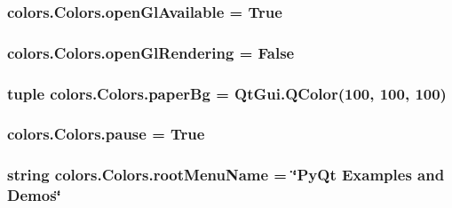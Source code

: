 \subsubsection[{open\+Gl\+Available}]{\setlength{\rightskip}{0pt plus 5cm}colors.\+Colors.\+open\+Gl\+Available = {\bf True}\hspace{0.3cm}{\ttfamily [static]}}\label{classcolors_1_1Colors_a4d91973ecabf3e7740dd09fbcc95982e}
\hypertarget{classcolors_1_1Colors_ab4faefdf4c3cb0a437cdd0eadb81b238}{}
\subsubsection[{open\+Gl\+Rendering}]{\setlength{\rightskip}{0pt plus 5cm}colors.\+Colors.\+open\+Gl\+Rendering = {\bf False}\hspace{0.3cm}{\ttfamily [static]}}\label{classcolors_1_1Colors_ab4faefdf4c3cb0a437cdd0eadb81b238}
\hypertarget{classcolors_1_1Colors_aef5420b74f0f68005bcf2a88d3f5200c}{}
\subsubsection[{paper\+Bg}]{\setlength{\rightskip}{0pt plus 5cm}tuple colors.\+Colors.\+paper\+Bg = Qt\+Gui.\+Q\+Color(100, 100, 100)\hspace{0.3cm}{\ttfamily [static]}}\label{classcolors_1_1Colors_aef5420b74f0f68005bcf2a88d3f5200c}
\hypertarget{classcolors_1_1Colors_a33b2117c663eabe2ca83e2a17ae660bd}{}
\subsubsection[{pause}]{\setlength{\rightskip}{0pt plus 5cm}colors.\+Colors.\+pause = {\bf True}\hspace{0.3cm}{\ttfamily [static]}}\label{classcolors_1_1Colors_a33b2117c663eabe2ca83e2a17ae660bd}
\hypertarget{classcolors_1_1Colors_a4fda4c85205913fd97fa583c1cdc66f6}{}
\subsubsection[{root\+Menu\+Name}]{\setlength{\rightskip}{0pt plus 5cm}string colors.\+Colors.\+root\+Menu\+Name = \char`\"{}Py\+Qt Examples and Demos\char`\"{}\hspace{0.3cm}{\ttfamily [static]}}\label{classcolors_1_1Colors_a4fda4c85205913fd97fa583c1cdc66f6}
\hypertarget{classcolors_1_1Colors_a07819baa8c69647aaa2da48054611c1b}{}
